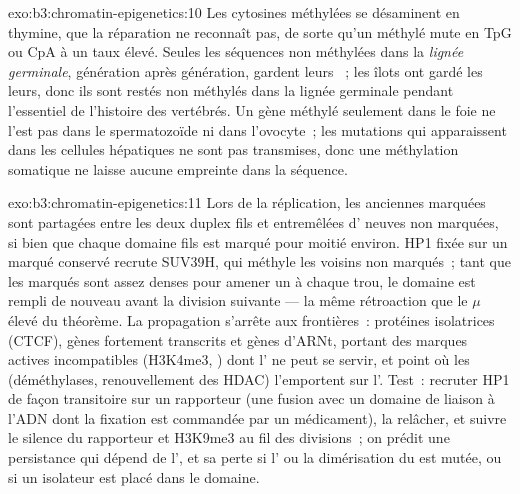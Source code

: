 \begin{solution}{exo:b3:chromatin-epigenetics:10}
Les cytosines méthylées se désaminent en thymine, que la réparation ne
reconnaît pas, de sorte qu'un  méthylé mute en TpG ou CpA à un taux
élevé. Seules les séquences non méthylées dans la \emph{lignée
germinale}, génération après génération, gardent leurs ~; les îlots
ont gardé les leurs, donc ils sont restés non méthylés dans la lignée
germinale pendant l'essentiel de l'histoire des vertébrés. Un gène
méthylé seulement dans le foie ne l'est pas dans le spermatozoïde ni
dans l'ovocyte~; les mutations qui apparaissent dans les cellules
hépatiques ne sont pas transmises, donc une méthylation somatique ne
laisse aucune empreinte dans la séquence.
\end{solution}

\begin{solution}{exo:b3:chromatin-epigenetics:11}
Lors de la réplication, les anciennes  marquées sont partagées
entre les deux duplex fils et entremêlées d' neuves non
marquées, si bien que chaque domaine fils est marqué pour moitié
environ. HP1 fixée sur un  marqué conservé recrute SUV39H,
qui méthyle les voisins non marqués~; tant que les  marqués
sont assez denses pour amener un  à chaque trou, le domaine est
rempli de nouveau avant la division suivante --- la même rétroaction
que le $\mu$ élevé du théorème. La propagation s'arrête aux
frontières~: protéines isolatrices (CTCF), gènes fortement transcrits
et gènes d'ARNt,  portant des marques actives incompatibles
(H3K4me3, ) dont l' ne peut se servir, et point où
les  (déméthylases, renouvellement des HDAC) l'emportent sur
l'. Test~: recruter HP1 de façon transitoire sur un rapporteur
(une fusion avec un domaine de liaison à l'ADN dont la fixation est
commandée par un médicament), la relâcher, et suivre le silence du
rapporteur et H3K9me3 au fil des divisions~; on prédit une persistance
qui dépend de l', et sa perte si l' ou la dimérisation
du  est mutée, ou si un isolateur est placé dans le domaine.
\end{solution}

